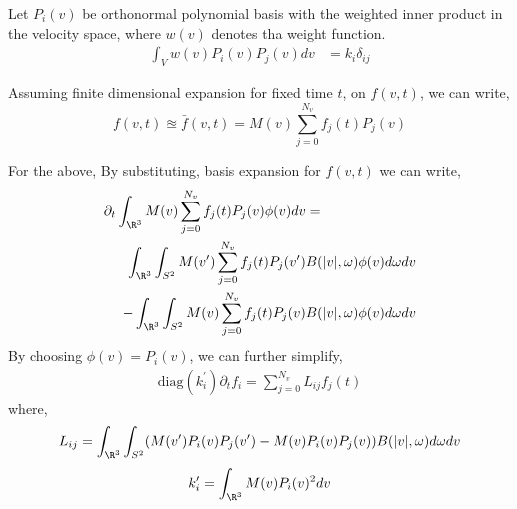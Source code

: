 Let $P_i(v)$ be orthonormal polynomial basis with the weighted inner product in the velocity space, where $w(v)$ denotes tha weight function. 
\begin{align}
    \int_{V} w(v)P_i(v)P_j(v) dv &= k_i\delta_{ij}
\end{align}

Assuming finite dimensional expansion for fixed time $t$, on $f(v,t)$, we can write, 
\begin{equation}
    f(v,t) \approxeq \bar{f}(v,t) = M(v)\sum_{j=0}^{N_v} f_j(t) P_j(v) \label{eq:basis_expansion}
\end{equation}

For the above, By substituting, basis expansion for $f(v,t)$ we can write, 
\begin{align}
    \partial_t \int_{\R^3} M(v)\sum_{j=0}^{N_v} f_j(t) P_j(v) \phi(v) dv &= \\\int_{\R^3} \int_{S^2} M(v^\prime)\sum_{j=0}^{N_v} f_j(t) P_j(v^\prime) & B(|v|,\omega) \phi(v) d\omega dv \nonumber \\
    -\int_{\R^3} \int_{S^2} M(v)\sum_{j=0}^{N_v} f_j(t) P_j(v) &B(|v|,\omega) \phi(v) d\omega dv
\end{align}
By choosing $\phi(v) = P_i(v)$, we can further simplify, 
\begin{align}
    \text{diag}(k_i^\prime)\partial_t{f_i} = \sum_{j=0}^{N_v} L_{ij} f_j(t)
\end{align} where, 
\begin{equation}
    L_{ij} = \int_{\R^3} \int_{S^2} (M(v^\prime) P_i(v)P_j(v^\prime)  - M(v) P_i(v) P_j(v) )  B(|v|,\omega) d\omega dv
\end{equation}
\begin{equation}
    k_{i}^\prime = \int_{\R^3} M(v) P_i(v)^2 dv
\end{equation}

